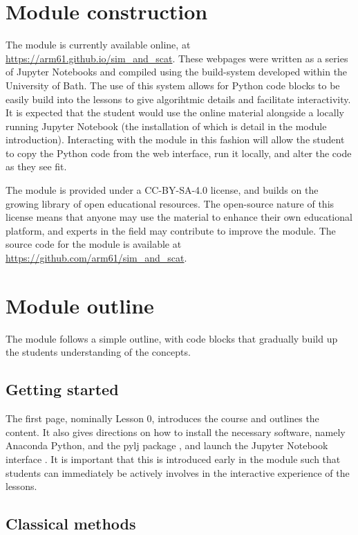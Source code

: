 \documentclass[amsmath,amssymb,twocolumn,superscriptaddress,aps,prl]{revtex4-1}
\begin{document}
\section{Module construction}

The module is currently available online, at \url{https://arm61.github.io/sim_and_scat}.
These webpages were written as a series of Jupyter Notebooks and compiled using the build-system developed within the University of Bath.
The use of this system allows for Python code blocks to be easily build into the lessons to give algorihtmic details and facilitate interactivity.
It is expected that the student would use the online material alongside a locally running Jupyter Notebook (the installation of which is detail in the module introduction).
Interacting with the module in this fashion will allow the student to copy the Python code from the web interface, run it locally, and alter the code as they see fit.

The module is provided under a CC-BY-SA-4.0 license, and builds on the growing library of open educational resources.
The open-source nature of this license means that anyone may use the material to enhance their own educational platform, and experts in the field may contribute to improve the module.
The source code for the module is available at \url{https://github.com/arm61/sim_and_scat}.

\section{Module outline}

The module follows a simple outline, with code blocks that gradually build up the students understanding of the concepts.

\subsection{Getting started}

The first page, nominally Lesson 0, introduces the course and outlines the content.
It also gives directions on how to install the necessary software, namely Anaconda Python, and the pylj package \cite{McCluskey2018}, and launch the Jupyter Notebook interface \cite{Kluyver2016}.
It is important that this is introduced early in the module such that students can immediately be actively involves in the interactive experience of the lessons.

\subsection{Classical methods}
\end{document}
